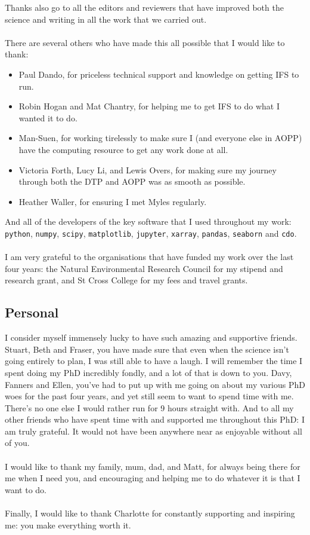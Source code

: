 Thanks also go to all the editors and reviewers that have improved both the science and writing in all the work that we carried out.\\\\
There are several others who have made this all possible that I would like to thank:
\begin{itemize}[label={},leftmargin=*]
    \item Paul Dando, for priceless technical support and knowledge on getting IFS to run.
    \item Robin Hogan and Mat Chantry, for helping me to get IFS to do what I wanted it to do.
    \item Man-Suen, for working tirelessly to make sure I (and everyone else in AOPP) have the computing resource to get any work done at all.
    \item Victoria Forth, Lucy Li, and Lewis Overs, for making sure my journey through both the DTP and AOPP was as smooth as possible.
    \item Heather Waller, for ensuring I met Myles regularly.
\end{itemize}
And all of the developers of the key software that I used throughout my work: \texttt{python}, \texttt{numpy}, \texttt{scipy}, \texttt{matplotlib}, \texttt{jupyter}, \texttt{xarray}, \texttt{pandas}, \texttt{seaborn} and \texttt{cdo}.\\\\
I am very grateful to the organisations that have funded my work over the last four years: the Natural Environmental Research Council for my stipend and research grant, and St Cross College for my fees and travel grants.
\subsection*{Personal}
I consider myself immensely lucky to have such amazing and supportive friends. Stuart, Beth and Fraser, you have made sure that even when the science isn't going entirely to plan, I was still able to have a laugh. I will remember the time I spent doing my PhD incredibly fondly, and a lot of that is down to you. Davy, Fanners and Ellen, you've had to put up with me going on about my various PhD woes for the past four years, and yet still seem to want to spend time with me. There's no one else I would rather run for 9 hours straight with. And to all my other friends who have spent time with and supported me throughout this PhD: I am truly grateful. It would not have been anywhere near as enjoyable without all of you.\\\\
I would like to thank my family, mum, dad, and Matt, for always being there for me when I need you, and encouraging and helping me to do whatever it is that I want to do.\\\\
Finally, I would like to thank Charlotte for constantly supporting and inspiring me: you make everything worth it.